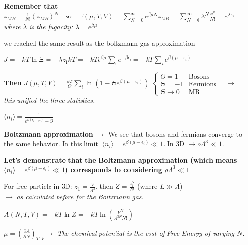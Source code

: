 \documentclass[12pt,a4paper]{report}
\newcommand{\esp}{\vspace{0.5cm}}
\begin{document}
	\esp
	
	\textbf{Remember that} $z_{MB} = \frac{1}{N!} (z_{MB})^N \quad \text{so} \quad \Xi(\mu, T, V) = \sum_{N=0}^{\infty} e^{\beta \mu N} z_{MB} = \sum_{N=0}^{\infty} \lambda^N \frac{z_1^N}{N!} = e^{\lambda z_1}$
	\textit{where } $\lambda$ \textit{ is the fugacity: } $\lambda = e^{\beta \mu}$
	
	\esp
	
	\noindent we reached the same result as the boltzmann gas approximation
	
	\esp
	
	$J = -kT \ln \Xi = -\lambda z_1 kT = -kT e^{\beta \mu} \sum_i e^{-\beta \epsilon_i} = -kT \sum_i e^{\beta(\mu - \epsilon_i)}$
	
	\esp
	
	\textbf{Then } $J(\mu, T, V) = \frac{kT}{\Theta} \sum_i \ln(1 - \Theta e^{\beta(\mu - \epsilon_i)})$ 
	$\begin{cases} \Theta = 1 & \text{Bosons} \\ \Theta = -1 & \text{Fermions} \\ \Theta \to 0 & \text{MB} \end{cases} \quad \to$ \textit{this unified the three statistics.}
	
	\esp
	
	$\langle n_i \rangle = \frac{1}{e^{\beta(\epsilon_i - \mu)} - \Theta}$
	
	\esp
	
	
	\esp
	
	\textbf{Boltzmann approximation} $\to$ We see that bosons and fermions converge to the same behavior.
	In this limit: $\langle n_i \rangle = e^{\beta(\mu - \epsilon_i)} \ll 1$. In 3D $\to \rho \Lambda^3 \ll 1$.
	
	\esp
	
	\textbf{Let's demonstrate that the Boltzmann approximation (which means $\langle n_i \rangle = e^{\beta(\mu - \epsilon_i)} \ll 1$) corresponds to considering $\rho \Lambda^3 \ll 1$}
	
	\esp
	
	For free particle in 3D: $z_1 = \frac{V}{\Lambda^3}$, then $Z = \frac{z_1^N}{N!}$ (where $L \gg \Lambda$) \\
	$\to$ \textit{as calculated before for the Boltzmann gas.}
	
	\esp
	
	$A(N, T, V) = -kT \ln Z = -kT \ln \left( \frac{V^N}{\Lambda^{3N} N!} \right)$
	
	\esp
	
	$\mu = \left( \frac{\partial A}{\partial N} \right)_{T, V} \to$ \textit{The chemical potential is the cost of Free Energy of varying $N$.}
	
\end{document}
